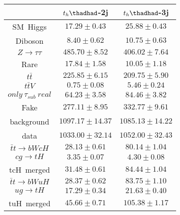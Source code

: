 \centering
\begin{tabular}{ccc}\toprule\toprule
 & $t_{h}\thadhad$-2j                      & $t_{h}\thadhad$-3j \\\midrule
SM~Higgs              & $17.29\pm0.43$                  & $25.88\pm0.43$     \\
Diboson               & $8.40\pm0.62$                    & $10.75\pm0.63$     \\
$Z\to\tau\tau$        & $485.70\pm8.52$           & $406.02\pm7.64$    \\
Rare                  & $17.84\pm1.58$                      & $10.05\pm1.18$     \\
$t\bar{t}$            & $225.85\pm6.15$               & $209.75\pm5.90$    \\
$t\bar{t}V$           & $0.75\pm0.08$                & $5.46\pm0.24$      \\
$only~\tau_{sub}~real$& $64.23\pm3.58$    & $84.46\pm3.82$     \\
Fake                  & $277.11\pm8.95$                     & $332.77\pm9.61$    \\
background            & $1097.17\pm14.37$             & $1085.13\pm14.22$  \\
data                  & $1033.00\pm32.14$                   & $1052.00\pm32.43$  \\
$\bar{t}t\to bWcH$    & $28.13\pm0.61$        & $80.14\pm1.04$     \\
$cg\to tH$            & $3.35\pm0.07$                 & $4.30\pm0.08$      \\
tcH~merged            & $31.48\pm0.61$                & $84.44\pm1.04$     \\
$\bar{t}t\to bWuH$    & $28.37\pm0.62$        & $83.75\pm1.10$     \\
$ug\to tH$            & $17.29\pm0.34$                & $21.63\pm0.40$     \\
tuH~merged            & $45.66\pm0.71$                & $105.38\pm1.17$    \\
\bottomrule\bottomrule
\end{tabular}